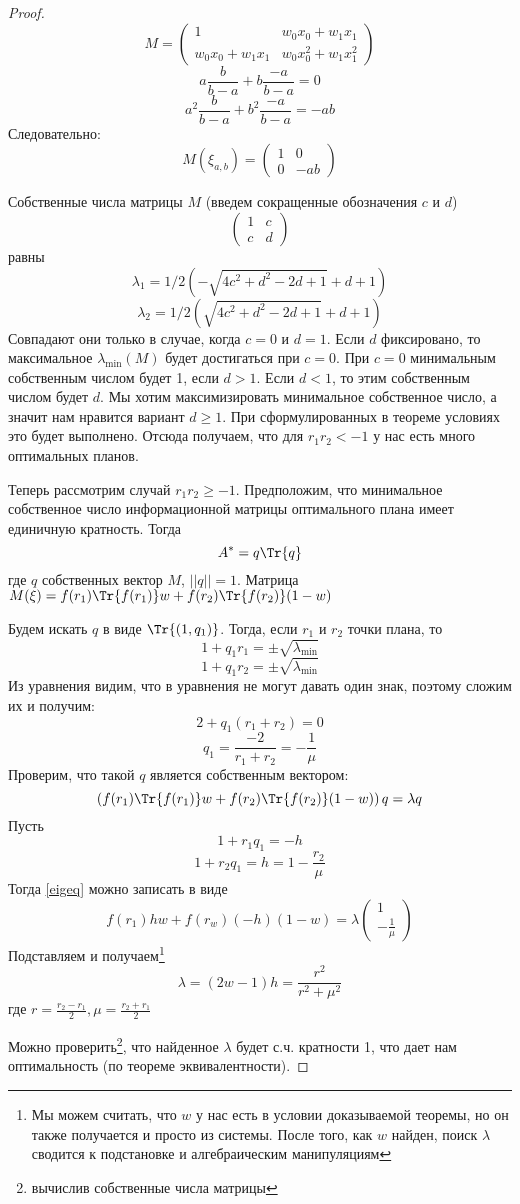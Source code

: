 \begin{proof}
$$ M = \begin{pmatrix} 1 & w_0 x_0 + w_1 x_1 \\ w_0 x_0 + w_1 x_1 & w_0 x_0^2 + w_1 x_1^2 \end{pmatrix}$$
$$ a \frac{b}{b-a} + b \frac{-a}{b-a} = 0$$
$$ a^2 \frac{b}{b-a} + b^2 \frac{-a}{b-a} = -ab$$
Следовательно: 
$$M(\xi_{a,b}) = \begin{pmatrix} 1 & 0 \\ 0 & -ab \end{pmatrix}$$

Собственные числа матрицы $M$ (введем сокращенные обозначения $c$ и $d$)
$$\begin{pmatrix} 1 & c \\ c & d \end{pmatrix}$$ 
равны
$$\lambda_1 = 1/2 (-\sqrt{4 c^2+d^2-2 d+1}+d+1)$$
$$ \lambda_2 = 1/2 (\sqrt{4 c^2+d^2-2 d+1}+d+1)$$
Совпадают они только в случае, когда $c=0$ и $d=1$. 
Если $d$ фиксировано, то максимальное $\lambda_{\min}(M)$ будет достигаться при $c = 0$. При $c=0$ минимальным собственным числом будет 1, если $d>1$. Если $d< 1$, то этим собственным числом будет $d$. Мы хотим максимизировать минимальное собственное число, а значит нам нравится вариант $d\geq 1$. При сформулированных в теореме условиях это будет выполнено. Отсюда получаем, что для $r_1r_2 < -1$ у нас есть много оптимальных планов.

Теперь рассмотрим случай $r_1r_2 \geq -1$. Предположим, что минимальное собственное число информационной матрицы оптимального плана имеет единичную кратность. Тогда
$$A^{*} = q\Tr{q}$$
где  $q$ собственных вектор $M$, $||q|| = 1$.
Матрица $M(\xi) = f(r_1)\Tr{f(r_1)}w + f(r_2)\Tr{f(r_2)}(1-w)$ 

Будем искать $q$ в виде $\Tr{(1, q_1)}$. Тогда, если $r_1$ и $r_2$ точки плана, то
$$ 1 + q_1r_1 = ±\sqrt{\lambda_{\min}}$$
$$ 1 + q_1r_2 = ±\sqrt{\lambda_{\min}}$$
Из уравнения видим, что в уравнения не могут давать один знак, поэтому сложим их и получим:
$$2 + q_1(r_1+r_2)=0$$
$$q_1 = \frac{-2}{r_1+r_2} = -\frac{1}{\mu}$$
Проверим, что такой $q$ является собственным вектором:
\begin{equation}
\label{eigeq}
\left(f(r_1)\Tr{f(r_1)}w + f(r_2)\Tr{f(r_2)}(1-w)\right)q = \lambda q
\end{equation}
Пусть 
$$ 1 + r_1 q_1 = -h$$
$$ 1 + r_2 q_1 = h = 1 - \frac{r_2}{\mu}$$ 
Тогда \eqref{eigeq} можно записать в виде
$$ f(r_1) h w + f(r_w)(-h)(1-w) = \lambda \begin{pmatrix} 1 \\ -\frac{1}{\mu} \end{pmatrix}$$
Подставляем и получаем\footnote{Мы можем считать, что $w$ у нас есть в условии доказываемой теоремы, но он также получается и просто из системы. После того, как $w$ найден, поиск $\lambda$ сводится к подстановке и алгебраическим манипуляциям}
$$ \lambda = (2w - 1)h = \frac{r^2}{r^2 + \mu ^2}$$ 
где $r = \frac{r_2 - r_1}{2}, \mu = \frac{r_2+r_1}{2}$

Можно проверить\footnote{вычислив собственные числа матрицы}, что найденное $\lambda$ будет с.ч. кратности 1, что дает нам оптимальность (по теореме эквивалентности).
 \end{proof}

